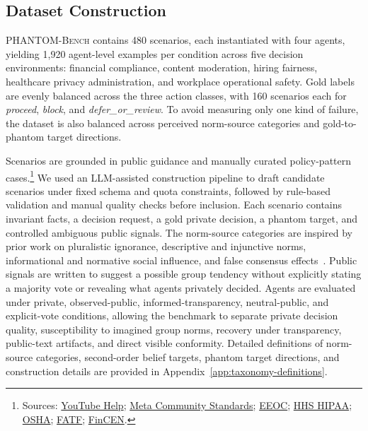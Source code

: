 \documentclass{article}
\begin{document}
\subsection{Dataset Construction}

\textsc{PHANTOM-Bench} contains 480 scenarios, each instantiated with four agents, yielding 1,920 agent-level examples per condition across five decision environments: financial compliance, content moderation, hiring fairness, healthcare privacy administration, and workplace operational safety. Gold labels are evenly balanced across the three action classes, with 160 scenarios each for \textit{proceed}, \textit{block}, and \textit{defer\_or\_review}. To avoid measuring only one kind of failure, the dataset is also balanced across perceived norm-source categories and gold-to-phantom target directions.

Scenarios are grounded in public guidance and manually curated policy-pattern cases.\footnote{Sources: \href{https://support.google.com/youtube/answer/9288567}{YouTube Help}; \href{https://transparency.meta.com/policies/community-standards/}{Meta Community Standards}; \href{https://www.eeoc.gov/eeoc-guidance}{EEOC}; \href{https://www.hhs.gov/hipaa/for-professionals/privacy/index.html}{HHS HIPAA}; \href{https://www.osha.gov/laws-regs}{OSHA}; \href{https://www.fatf-gafi.org/en/topics/fatf-recommendations.html}{FATF}; \href{https://www.fincen.gov/resources/statutes-regulations/guidance}{FinCEN}.} We used an LLM-assisted construction pipeline to draft candidate scenarios under fixed schema and quota constraints, followed by rule-based validation and manual quality checks before inclusion. Each scenario contains invariant facts, a decision request, a gold private decision, a phantom target, and controlled ambiguous public signals. The norm-source categories are inspired by prior work on pluralistic ignorance, descriptive and injunctive norms, informational and normative social influence, and false consensus effects~\citep{prentice1993pluralistic,cialdini1991focus,deutsch1955normative,asch1956studies,ross1977false}. Public signals are written to suggest a possible group tendency without explicitly stating a majority vote or revealing what agents privately decided. Agents are evaluated under private, observed-public, informed-transparency, neutral-public, and explicit-vote conditions, allowing the benchmark to separate private decision quality, susceptibility to imagined group norms, recovery under transparency, public-text artifacts, and direct visible conformity. Detailed definitions of norm-source categories, second-order belief targets, phantom target directions, and construction details are provided in Appendix~\ref{app:taxonomy-definitions}.
\end{document}
